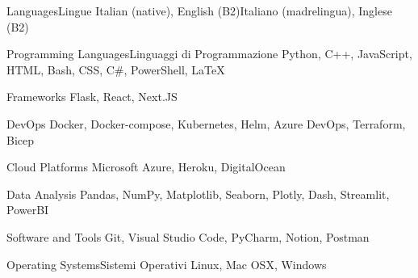 \begin{cvskills}

\cvskill
{\ifenglish Languages\else Lingue\fi} %
{\ifenglish Italian (native), English (B2)\else Italiano (madrelingua), Inglese (B2)\fi} %
\end{cvskills}



\begin{cvskills}


\cvskill
{\ifenglish Programming Languages\else Linguaggi di Programmazione\fi} %
{Python, C++, JavaScript, HTML, Bash, CSS, C\#, PowerShell, LaTeX} %

\cvskill
{Frameworks} %
{Flask, React, Next.JS} %


\cvskill
{DevOps} %
{Docker, Docker-compose, Kubernetes, Helm, Azure DevOps, Terraform, Bicep} %

\cvskill
{Cloud Platforms} %
{Microsoft Azure, Heroku, DigitalOcean} %

\cvskill
{Data Analysis} %
{Pandas, NumPy, Matplotlib, Seaborn, Plotly, Dash, Streamlit, PowerBI} %


\cvskill
{Software and Tools} %
{Git, Visual Studio Code, PyCharm, Notion, Postman} %


\cvskill
{\ifenglish Operating Systems\else Sistemi Operativi\fi} %
{Linux, Mac OSX, Windows} %


\end{cvskills}